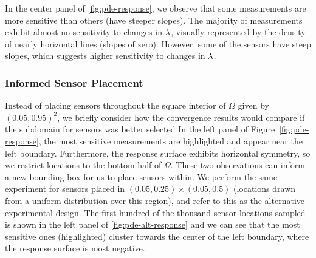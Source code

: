 In the center panel of \ref{fig:pde-response}, we observe that some measurements are more sensitive than others (have steeper slopes).
The majority of measurements exhibit almost no sensitivity to changes in $\lambda$, visually represented by the density of nearly horizontal lines (slopes of zero).
However, some of the sensors have steep slopes, which suggests higher sensitivity to changes in $\lambda$.


\FloatBarrier
\subsubsection{Informed Sensor Placement}
Instead of placing sensors throughout the square interior of $\Omega$ given by $(0.05, 0.95)^2$, we briefly consider how the convergence results would compare if the subdomain for sensors was better selected
In the left panel of Figure~\ref{fig:pde-response}, the most sensitive measurements are highlighted and appear near the left boundary.
Furthermore, the response surface exhibits horizontal symmetry, so we restrict locations to the bottom half of $\Omega$.
These two observations can inform a new bounding box for us to place sensors within.
We perform the same experiment for sensors placed in $(0.05, 0.25)\times(0.05, 0.5)$ (locations drawn from a uniform distribution over this region), and refer to this as the alternative experimental design.
The first hundred of the thousand sensor locations sampled is shown in the left panel of \ref{fig:pde-alt-response} and we can see that the most sensitive ones (highlighted) cluster towards the center of the left boundary, where the response surface is most negative.


